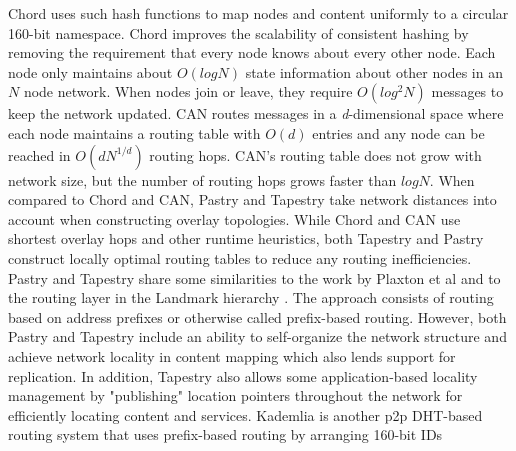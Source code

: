 % 
% 
Chord uses such hash functions to map nodes and content uniformly to a circular 160-bit
namespace. Chord improves the scalability of consistent hashing by removing the requirement that every node knows about
every other node. Each node only maintains about \(O (log N) \) state information about other nodes in an \( N \) node
network. When nodes join or leave, they require \( O(log^2 N) \) messages to keep the network updated. CAN routes messages in a {\em d}-dimensional space where each node maintains a routing table with \(O(d)\) entries and
any node can be reached in \(O(dN^{1/d})\) routing hops. CAN's routing table does not grow with network size, but the
number of routing hops grows faster than \(log N\). When compared to Chord and CAN, Pastry and Tapestry take network distances into account when constructing overlay
topologies. While Chord and CAN use shortest overlay hops and other runtime heuristics, both Tapestry and Pastry
construct locally optimal routing tables to reduce any routing inefficiencies. 
\newline\newline
Pastry and Tapestry share some similarities to the work by Plaxton et al \cite{Plaxton_1997} and to the routing layer in
the Landmark hierarchy \cite{Tsuchiya_1988}. The approach consists of routing based on address prefixes or otherwise
called prefix-based routing. However, both Pastry and Tapestry include an ability to self-organize the network structure
and achieve network locality in content mapping which also lends support for replication.
In addition, Tapestry also allows some application-based locality management by "publishing" location pointers
throughout the network for efficiently locating content and services.
\newline\newline
Kademlia \cite{kademlia} is another p2p DHT-based routing system that uses prefix-based routing by arranging 160-bit IDs
